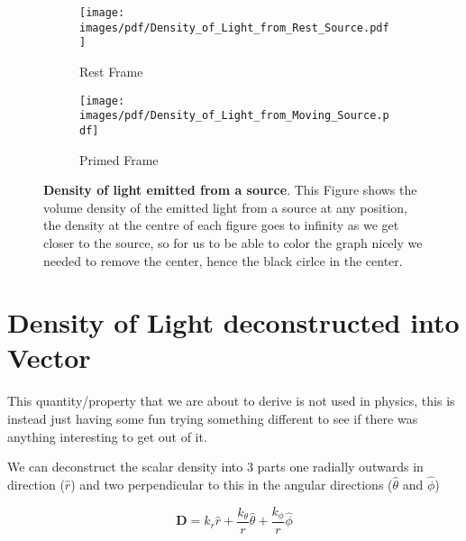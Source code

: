 \begin{figure}[H]
	\centering
	\begin{subfigure}{0.45\textwidth}
		\centering
		\texttt{[image: images/pdf/Density\_of\_Light\_from\_Rest\_Source.pdf]}
		\caption{Rest Frame}
		\label{subfig_1: Density of light emitted from a source}
	\end{subfigure}
	\begin{subfigure}{0.45\textwidth}
		\centering
		\texttt{[image: images/pdf/Density\_of\_Light\_from\_Moving\_Source.pdf]}
		\caption{Primed Frame}
		\label{subfig_2: Density of light emitted from a source}
	\end{subfigure}
	\caption{\textbf{Density of light emitted from a source}. This Figure shows the volume density of the emitted light from a source at any position, the density at the centre of each figure goes to infinity as we get closer to the source, so for us to be able to color the graph nicely we needed to remove the center, hence the black cirlce in the center.}
	\label{fig: Density of light emitted from a source}
\end{figure}

\section{Density of Light deconstructed into Vector}\label{sect: Field Vector Density}

This quantity/property that we are about to derive is not used in physics, this is instead just having some fun trying something different to see if there was anything interesting to get out of it.

We can deconstruct the scalar density into 3 parts one radially outwards in direction ($\hat{r}$) and two perpendicular to this in the angular directions ($\hat{\theta}$ and $\hat{\phi}$)


\begin{equation}
	\mathbf{D} = k_r \hat{r} + \frac{k_\theta}{r} \hat{\theta} + \frac{k_\phi}{r} \hat{\phi}
\end{equation}

